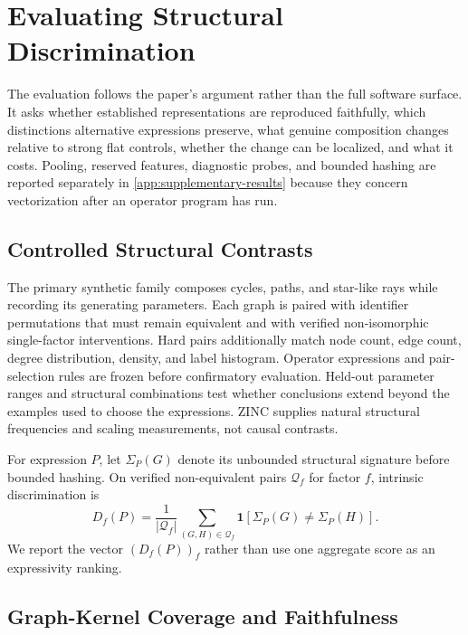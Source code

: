 \section{Evaluating Structural Discrimination}
\label{sec:experimental-protocol}

The evaluation follows the paper's argument rather than the full software
surface. It asks whether established representations are reproduced faithfully,
which distinctions alternative expressions preserve, what genuine composition
changes relative to strong flat controls, whether the change can be localized,
and what it costs. Pooling, reserved features, diagnostic probes, and bounded
hashing are reported separately in \cref{app:supplementary-results} because
they concern vectorization after an operator program has run.

\subsection{Controlled Structural Contrasts}

The primary synthetic family composes cycles, paths, and star-like rays while
recording its generating parameters. Each graph is paired with identifier
permutations that must remain equivalent and with verified non-isomorphic
single-factor interventions. Hard pairs additionally match node count, edge
count, degree distribution, density, and label histogram. Operator expressions
and pair-selection rules are frozen before confirmatory evaluation. Held-out
parameter ranges and structural combinations test whether conclusions extend
beyond the examples used to choose the expressions. ZINC supplies natural
structural frequencies and scaling measurements, not causal contrasts.

For expression $P$, let $\Sigma_P(G)$ denote its unbounded structural signature
before bounded hashing. On verified non-equivalent pairs $\mathcal Q_f$ for
factor $f$, intrinsic discrimination is
\begin{equation}
 D_f(P)=\frac{1}{|\mathcal Q_f|}
 \sum_{(G,H)\in\mathcal Q_f}
 \mathbf{1}[\Sigma_P(G)\ne\Sigma_P(H)].
\end{equation}
We report the vector $(D_f(P))_f$ rather than use one aggregate score as an
expressivity ranking.

\subsection{Graph-Kernel Coverage and Faithfulness}

